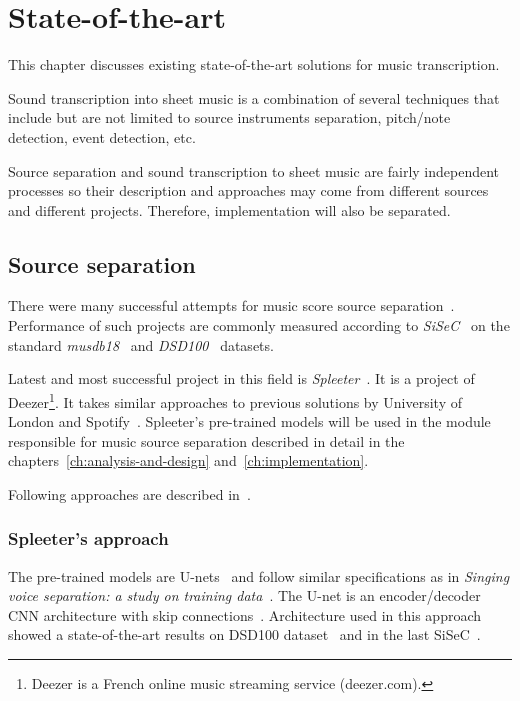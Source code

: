 \chapter{State-of-the-art}\label{ch:state-of-the-art}

This chapter discusses existing state-of-the-art solutions for music transcription.

Sound transcription into sheet music is a combination of several techniques that include but are not limited to source
instruments separation, pitch/note detection, event detection, etc.

Source separation and sound transcription to sheet music are fairly independent processes so their description and
approaches may come from different sources and different projects. Therefore, implementation will also be separated.

\section{Source separation}\label{sec:source-separation}

There were many successful attempts for music score source separation~\cite{spleeter2019,singing-voice-separation,singing-voice-separation-article}.
Performance of such projects are commonly measured according to \textit{\ac{SiSeC}}~\cite{stter20182018}
on the standard \textit{musdb18}~\cite{musdb18} and \textit{DSD100}~\cite{SiSEC16} datasets.

Latest and most successful project in this field is \textit{Spleeter}~\cite{spleeter2019}. It is a project of
Deezer\footnote{Deezer is a French online music streaming service (deezer.com).}. It takes similar approaches to previous solutions
by University of London and Spotify~\cite{singing-voice-separation}. Spleeter's pre-trained models will be used in the
module responsible for music source separation described in detail in the chapters~\ref{ch:analysis-and-design} and~\ref{ch:implementation}.

Following approaches are described in~\cite{spleeter2019,singing-voice-separation,singing-voice-separation-article}.

\subsection{Spleeter's approach}\label{subsec:music-source-separation:approach}
The pre-trained models are U-nets~\cite{singing-voice-separation} and follow similar specifications as in
\textit{Singing voice separation: a study on training data}~\cite{singing-voice-separation-article}. The U-net is an
encoder/decoder \ac{CNN} architecture with skip connections~\cite{spleeter2019}. Architecture used in this approach
showed a state-of-the-art results on DSD100 dataset~\cite{singing-voice-separation} and in the last \ac{SiSeC}~\cite{SiSEC16}.

